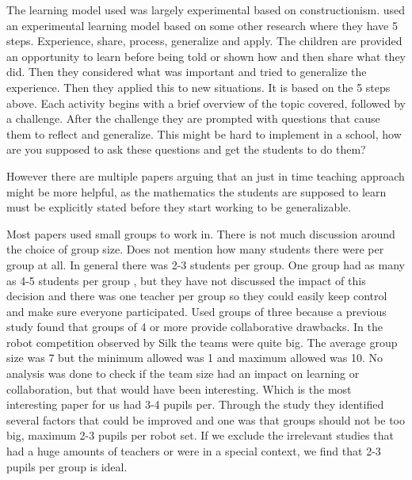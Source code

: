 \bigskip\noindent
The learning model used was largely experimental based on constructionism.
\cite{barker2007robotics} used an experimental learning model based on some other research where they have 5 steps. Experience, share, process, generalize and apply. 
\cite{barker2007robotics} The children are provided an opportunity to learn before being told or shown how and then share what they did. Then they considered what was important and tried to generalize the experience. Then they applied this to new situations. It is based on the 5 steps above. 
\cite{barker2007robotics} Each activity begins with a brief overview of the topic covered, followed by a challenge. After the challenge they are prompted with questions that cause them to reflect and generalize. This might be hard to implement in a school, how are you supposed to ask these questions and get the students to do them?

\bigskip\noindent
However there are multiple papers arguing that an just in time teaching approach might be more helpful, as the mathematics the students are supposed to learn must be explicitly stated before they start working to be generalizable. 

\bigskip\noindent
Most papers used small groups to work in. There is not much discussion around the choice of group size. \cite{nugent2008effect} Does not mention how many students there were per group at all. In general there was 2-3 students per group\cite{mitnik2009collaborative, norton2004using, lindh2007does, silk2011resources, nugent2009use, williams2007acquisition}. One group had as many as 4-5 students per group \cite{barker2007robotics}, but they have not discussed the impact of this decision and there was one teacher per group so they could easily keep control and make sure everyone participated. \cite{mitnik2009collaborative} Used groups of three because a previous study found that groups of 4 or more provide collaborative drawbacks. In the robot competition observed by Silk \cite{silk2011resources} the teams were quite big. The average group size was 7 but the minimum allowed was 1 and maximum allowed was 10. No analysis was done to check if the team size had an impact on learning or collaboration, but that would have been interesting. \cite{lindh2007does} Which is the most interesting paper for us had 3-4 pupils per. Through the study they identified several factors that could be improved and one was that groups should not be too big, maximum 2-3 pupils per robot set. If we exclude the irrelevant studies that had a huge amounts of teachers or were in a special context, we find that 2-3 pupils per group is ideal.

